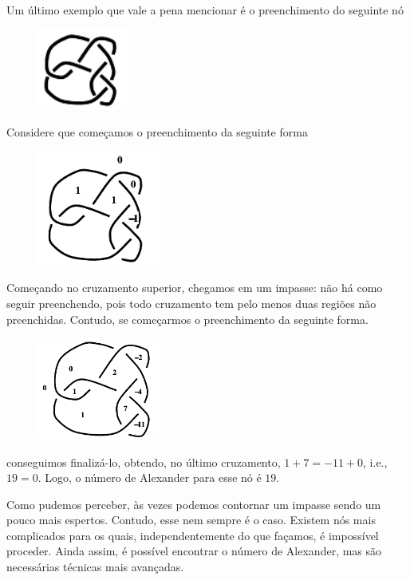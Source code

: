 	\par\vspace{0.3cm} Um último exemplo que vale a pena mencionar é o preenchimento do seguinte nó
	\begin{figure}[H]
		\begin{center}
			\includegraphics[width=3cm]{Images/no_exemplo_travado.png}
		\end{center}
	\end{figure}
	Considere que começamos o preenchimento da seguinte forma
	\begin{figure}[H]
		\begin{center}
			\includegraphics[width=4cm]{Images/no_preenchimento_incompleto.png}
		\end{center}
	\end{figure}
	Começando no cruzamento superior, chegamos em um impasse: não há como seguir preenchendo, 
	pois todo cruzamento tem pelo menos duas regiões não preenchidas. Contudo, se começarmos 
	o preenchimento da seguinte forma.
	\begin{figure}[H]
		\begin{center}
			\includegraphics[width=4cm]{Images/no_preenchimento_completo.png}
		\end{center}
	\end{figure}
	conseguimos finalizá-lo, obtendo, no último cruzamento, $1+7=-11+0$, i.e., $19=0$. 
	Logo, o número de Alexander para esse nó é $19$.
	
	\par\vspace{0.3cm} Como pudemos perceber, às vezes podemos contornar um impasse 
	sendo um pouco mais espertos. Contudo, esse nem sempre é o caso. Existem nós mais 
	complicados para os quais, independentemente do que façamos, é impossível proceder. 
	Ainda assim, é possível encontrar o número de Alexander, mas são necessárias técnicas mais avançadas.
